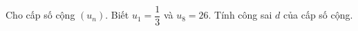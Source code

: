 \begin{ex}
Cho cấp số cộng $(u_n)$. Biết $u_1=\dfrac13$ và $u_8=26$. Tính công sai $d$ của cấp số cộng.
\end{ex}
